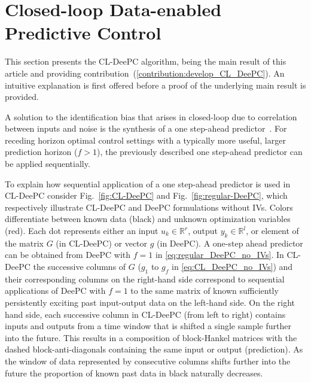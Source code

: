 \section{Closed-loop Data-enabled Predictive Control}
\noindent This section presents the \ac{CL-DeePC} algorithm, being the main result of this article and providing contribution~(\ref{contribution:develop_CL_DeePC}). An intuitive explanation is first offered before a proof of the underlying main result is provided.

A solution to the identification bias that arises in closed-loop due to correlation between inputs and noise %
is the synthesis of a one step-ahead predictor~\citep{Ljung1996}. For receding horizon optimal control settings with a typically more useful, larger prediction horizon ($f>1$), the previously described one step-ahead predictor can be applied sequentially.

To explain how sequential application of a one step-ahead predictor is used in \ac{CL-DeePC} consider Fig.~\ref{fig:CL-DeePC} and Fig.~\ref{fig:regular-DeePC}, which respectively illustrate \ac{CL-DeePC} and \ac{DeePC} formulations without \ac{IVs}. Colors differentiate between known data (black) and unknown optimization variables (red). Each dot represents either an input ${u_k\in\mathbb{R}^r}$, output ${y_k\in\mathbb{R}^l}$, or element of the matrix $G$ (in \ac{CL-DeePC}) or vector $g$ (in \ac{DeePC}). A one-step ahead predictor can be obtained from \ac{DeePC} with $f=1$ in \eqref{eq:regular_DeePC_no_IVs}. In \ac{CL-DeePC} the successive columns of $G$ ($g_1$ to $g_f$ in \eqref{eq:CL_DeePC_no_IVs}) and their corresponding columns on the right-hand side correspond to sequential applications of \ac{DeePC} with $f=1$ to the same matrix of known sufficiently persistently exciting past input-output data on the left-hand side. On the right hand side, each successive column in \ac{CL-DeePC} (from left to right) contains inputs and outputs from a time window that is shifted a single sample further into the future. This results in a composition of block-Hankel matrices with the dashed block-anti-diagonals containing the same input or output (prediction). As the window of data represented by consecutive columns shifts further into the future the proportion of known past data in black naturally decreases.
%

